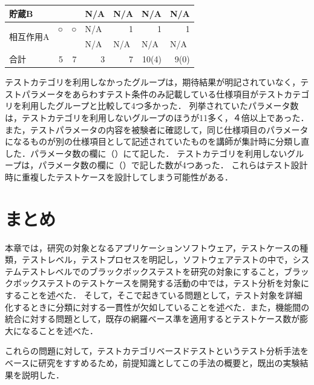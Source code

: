 \begin{table}[htbp]
\begin{tabular}{|l|r|r|r|r|r|r|}
    \hline
    貯蔵B   &       &       & \multicolumn{1}{l|}{N/A} & \multicolumn{1}{l|}{N/A} & \multicolumn{1}{l|}{N/A} & \multicolumn{1}{l|}{N/A} \bigstrut\\
    \hline
    \multirow{2}[4]{*}{相互作用A} & \multicolumn{1}{c|}{○} & \multicolumn{1}{c|}{○} & \multicolumn{1}{l|}{N/A} & 1     & 1     & 1 \bigstrut\\
\cline{2-7}          &       &       & \multicolumn{1}{l|}{N/A} & \multicolumn{1}{l|}{N/A} & \multicolumn{1}{l|}{N/A} & \multicolumn{1}{l|}{N/A} \bigstrut\\
    \hline
    合計    & 5     & 7     & 3     & 7     & 10(4) & 9(0) \bigstrut\\
    \hline
    \end{tabular}%
  \label{tab:D-2-resilt2}%
\end{table}%


テストカテゴリを利用しなかったグループは，期待結果が明記されていなく，テストパラメータをあらわすテスト条件のみ記載している仕様項目がテストカテゴリを利用したグループと比較して4つ多かった．
列挙されていたパラメータ数は，テストカテゴリを利用しないグループのほうが11多く，４倍以上であった．
また，テストパラメータの内容を被験者に確認して，同じ仕様項目のパラメータになるものが別の仕様項目として記述されていたものを講師が集計時に分類し直した．パラメータ数の欄に（）にて記した．
テストカテゴリを利用しないグループは，パラメータ数の欄に（）で記した数が4つあった．
これらはテスト設計時に重複したテストケースを設計してしまう可能性がある．

\section{まとめ}
本章では，研究の対象となるアプリケーションソフトウェア，テストケースの種類，テストレベル，テストプロセスを明記し，ソフトウェアテストの中で，システムテストレベルでのブラックボックステストを研究の対象にすること，ブラックボックステストのテストケースを開発する活動の中では，テスト分析を対象にすることを述べた．
そして，そこで起きている問題として，テスト対象を詳細化するときに分類に対する一貫性が欠如していることを述べた．また，機能間の統合に対する問題として，既存の網羅ベース準を適用するとテストケース数が膨大になることを述べた．

これらの問題に対して，テストカテゴリベースドテストというテスト分析手法をベースに研究をすすめるため，前提知識としてこの手法の概要と，既出の実験結果を説明した．
